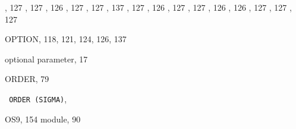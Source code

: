 \begin{theindex}
    , 127
    , 127
    , 126
    , 127
    , 127
    , 137
    , 127
    , 126
    , 127
    , 127
    , 126
    , 126
    , 127
    , 127
    , 127
  \item {\ttfamily  OPTION}, 118, 121, 124, 126, 137
  \item optional parameter, 17
  \item {\ttfamily  ORDER}, 79
  \item \texttt  { ORDER \textrm  {(SIGMA)}}, 
  \item OS9, 154
    \subitem module, 90

  \indexspace


\end{theindex}
